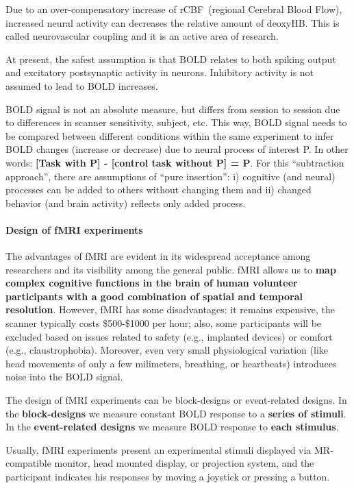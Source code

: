 \documentclass[12pt,article,oneside,a4paper]{memoir}
\begin{document}
Due to an over-compensatory increase of rCBF~(regional Cerebral Blood Flow),
increased neural activity can decreases the relative amount of deoxyHB.
This is called neurovascular coupling and it is an active area of research.

At present, the safest assumption is that BOLD relates to both spiking output
and excitatory postsynaptic activity in neurons. Inhibitory activity is not
assumed to lead to BOLD increases.

BOLD signal is not an absolute measure, but differs from session to session due
to differences in scanner sensitivity, subject, etc. This way, BOLD signal
needs to be compared between different conditions within the same experiment to
infer BOLD changes (increase or decrease) due to neural process of interest P.
In other words: \textbf{[Task with P] - [control task without P] = P}.
For this ``subtraction approach'', there are assumptions of ``pure insertion'':
i) cognitive (and neural) processes can be added to others without changing
them and ii) changed behavior (and brain activity) reflects only added process.

\paragraph{Design of fMRI experiments}
The advantages of fMRI are evident in its widespread acceptance among
researchers and its visibility among the general public. fMRI allows us to
\textbf{map complex cognitive functions in the brain of human volunteer
participants with a good combination of spatial and temporal resolution}.
However, fMRI has some disadvantages: it remains expensive, the scanner
typically costs \$500-\$1000 per hour; also, some participants will be excluded
based on issues related to safety (e.g., implanted devices) or comfort (e.g.,
claustrophobia). Moreover, even very small physiological variation (like head
movements of only a few milimeters, breathing, or heartbeats) introduces noise
into the BOLD signal.

The design of fMRI experiments can be block-designs or event-related designs.
In the \textbf{block-designs} we measure constant BOLD response to a
\textbf{series of stimuli}. In the \textbf{event-related designs} we measure
BOLD response to \textbf{each stimulus}.

Usually, fMRI experiments present an experimental stimuli displayed via
MR-compatible monitor, head mounted display, or projection system, and the
participant indicates his responses by moving a joystick or pressing a button.
\end{document}
